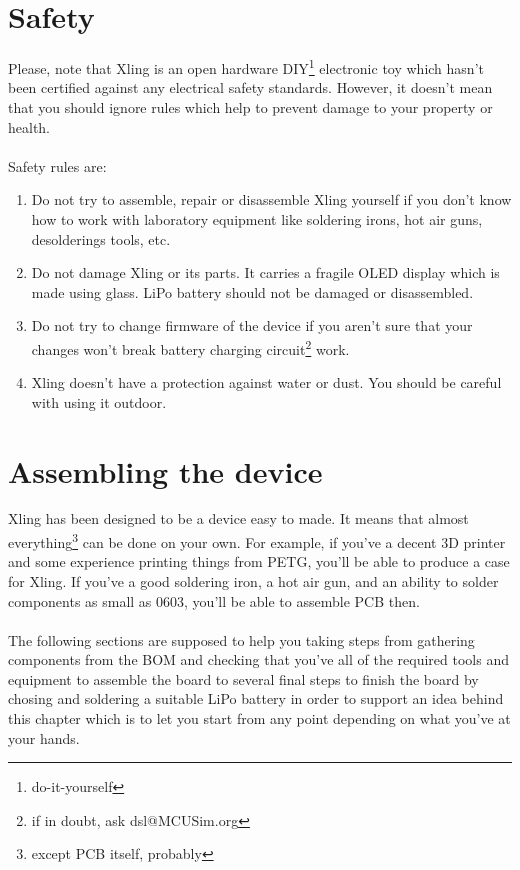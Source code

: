 \documentclass[11pt,a4paper,twoside]{report}
\begin{document}
\chapter{Safety}
\label{chap:safety}
Please, note that Xling is an open hardware DIY\footnote{do-it-yourself}
electronic toy which hasn't been certified against any electrical safety
standards. However, it doesn't mean that you should ignore rules which help
to prevent damage to your property or health.
\\
\\
Safety rules are:
\begin{enumerate}
	\item
	Do not try to assemble, repair or disassemble Xling yourself if you
	don't know how to work with laboratory equipment like soldering irons,
	hot air guns, desolderings tools, etc.
	\item
	Do not damage Xling or its parts. It carries a fragile OLED display
	which is made using glass. LiPo battery should not be damaged or
	disassembled.
	\item
	Do not try to change firmware of the device if you aren't sure that
	your changes won't break battery charging circuit\footnote{if in doubt,
	ask dsl@MCUSim.org} work.
	\item
	Xling doesn't have a protection against water or dust. You should be
	careful with using it outdoor.
\end{enumerate}

\chapter{Assembling the device}
\label{chap:assembling_device}
Xling has been designed to be a device easy to made. It means that almost
everything\footnote{except PCB itself, probably} can be done on your own.
For example, if you've a decent 3D printer and some experience printing things
from PETG, you'll be able to produce a case for Xling. If you've a good
soldering iron, a hot air gun, and an ability to solder components as small
as 0603, you'll be able to assemble PCB then.
\\
\\
The following sections are supposed to help you taking steps from gathering
components from the BOM and checking that you've all of the required tools and
equipment to assemble the board to several final steps to finish the board by
chosing and soldering a suitable LiPo battery in order to support an idea
behind this chapter which is to let you start from any point depending on
what you've at your hands.
\end{document}

